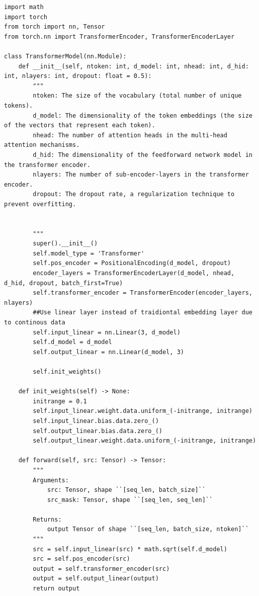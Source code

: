 \documentclass[11pt]{article}
\begin{document}
\begin{lstlisting}[caption={Transformer implementation}, label=transformer]
import math
import torch
from torch import nn, Tensor
from torch.nn import TransformerEncoder, TransformerEncoderLayer

class TransformerModel(nn.Module):
    def __init__(self, ntoken: int, d_model: int, nhead: int, d_hid: int, nlayers: int, dropout: float = 0.5):
        """
        ntoken: The size of the vocabulary (total number of unique tokens).
        d_model: The dimensionality of the token embeddings (the size of the vectors that represent each token).
        nhead: The number of attention heads in the multi-head attention mechanisms.
        d_hid: The dimensionality of the feedforward network model in the transformer encoder.
        nlayers: The number of sub-encoder-layers in the transformer encoder.
        dropout: The dropout rate, a regularization technique to prevent overfitting.


        """
        super().__init__()
        self.model_type = 'Transformer'
        self.pos_encoder = PositionalEncoding(d_model, dropout)
        encoder_layers = TransformerEncoderLayer(d_model, nhead, d_hid, dropout, batch_first=True)
        self.transformer_encoder = TransformerEncoder(encoder_layers, nlayers)
        ##Use linear layer instead of traidiontal embedding layer due to continous data
        self.input_linear = nn.Linear(3, d_model)
        self.d_model = d_model
        self.output_linear = nn.Linear(d_model, 3)

        self.init_weights()

    def init_weights(self) -> None:
        initrange = 0.1
        self.input_linear.weight.data.uniform_(-initrange, initrange)
        self.input_linear.bias.data.zero_()
        self.output_linear.bias.data.zero_()
        self.output_linear.weight.data.uniform_(-initrange, initrange)

    def forward(self, src: Tensor) -> Tensor:
        """
        Arguments:
            src: Tensor, shape ``[seq_len, batch_size]``
            src_mask: Tensor, shape ``[seq_len, seq_len]``

        Returns:
            output Tensor of shape ``[seq_len, batch_size, ntoken]``
        """
        src = self.input_linear(src) * math.sqrt(self.d_model)
        src = self.pos_encoder(src)
        output = self.transformer_encoder(src)
        output = self.output_linear(output)
        return output
    
\end{lstlisting}
\end{document}
